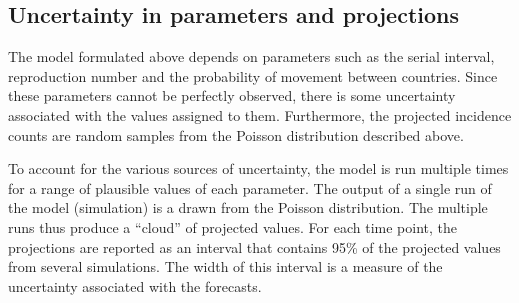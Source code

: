 \documentclass[a4paper,12pt]{article}
\begin{document}
\subsection*{Uncertainty in parameters and projections}

The model formulated above depends on parameters such as the serial
interval, reproduction number and the probability of movement between
countries. Since these
parameters cannot be perfectly observed, there is some uncertainty
associated with the values assigned to them. Furthermore, the
projected incidence counts are random samples from the Poisson distribution described above.

To account for the various sources of uncertainty, the model is run multiple times for a range of plausible values of each
parameter. The output of a single run of the model (simulation) is a
drawn from the  Poisson distribution. The multiple runs thus produce a ``cloud'' of
projected values. For each time point, the projections are reported as an interval
that contains 95\% of the projected values from several
simulations. The width of this interval is a measure of the uncertainty
associated with the forecasts.
\end{document}
